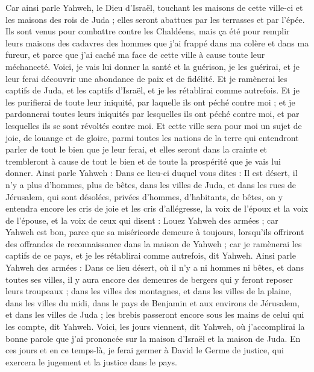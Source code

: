 \begin{multicols}{2}
Car ainsi parle Yahweh, le Dieu d'Israël, touchant les maisons de cette ville-ci et les maisons des rois de Juda ; elles seront abattues par les terrasses et par l'épée.
Ils sont venus pour combattre contre les Chaldéens, mais ça été pour remplir leurs maisons des cadavres des hommes que j'ai frappé dans ma colère et dans ma fureur, et parce que j'ai caché ma face de cette ville à cause toute leur méchanceté.
Voici, je vais lui donner la santé et la guérison, je les guérirai, et je leur ferai découvrir une abondance de paix et de fidélité.
Et je ramènerai les captifs de Juda, et les captifs d'Israël, et je les rétablirai comme autrefois.
Et je les purifierai de toute leur iniquité, par laquelle ils ont péché contre moi ; et je pardonnerai toutes leurs iniquités par lesquelles ils ont péché contre moi, et par lesquelles ils se sont révoltés contre moi.
Et cette ville sera pour moi un sujet de joie, de louange et de gloire, parmi toutes les nations de la terre qui entendront parler de tout le bien que je leur ferai, et elles seront dans la crainte et trembleront à cause de tout le bien et de toute la prospérité que je vais lui donner.
Ainsi parle Yahweh : Dans ce lieu-ci duquel vous dites : Il est désert, il n'y a plus d'hommes, plus de bêtes, dans les villes de Juda, et dans les rues de Jérusalem, qui sont désolées, privées d'hommes, d'habitants, de bêtes,
on y entendra encore les cris de joie et les cris d'allégresse, la voix de l'époux et la voix de l'épouse, et la voix de ceux qui disent : Louez Yahweh des armées ; car Yahweh est bon, parce que sa miséricorde demeure à toujours, lorsqu'ils offriront des offrandes de reconnaissance dans la maison de Yahweh ; car je ramènerai les captifs de ce pays, et je les rétablirai comme autrefois, dit Yahweh.
Ainsi parle Yahweh des armées : Dans ce lieu désert, où il n'y a ni hommes ni bêtes, et dans toutes ses villes, il y aura encore des demeures de bergers qui y feront reposer leurs troupeaux ;
dans les villes des montagnes, et dans les villes de la plaine, dans les villes du midi, dans le pays de Benjamin et aux environs de Jérusalem, et dans les villes de Juda ; les brebis passeront encore sous les mains de celui qui les compte, dit Yahweh.
Voici, les jours viennent, dit Yahweh, où j'accomplirai la bonne parole que j'ai prononcée sur la maison d'Israël et la maison de Juda.
En ces jours et en ce temps-là, je ferai germer à David le Germe de justice, qui exercera le jugement et la justice dans le pays.

\end{multicols}
